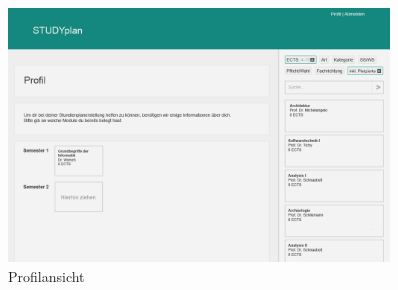 \begin{figure}
	\caption{Profilansicht}
	\label{fig:gui-profil-1}
	\centering
	\includegraphics[width=0.9\textwidth]{../GUI/ergebnisse/profil-1.png}
\end{figure}
\FloatBarrier